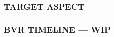 \subsubsection{TARGET ASPECT}

\begin{tcoloritemize}
\end{tcoloritemize}

\marginfigeometry

\subsubsection{BVR TIMELINE --- WIP}

\marginfigrestore